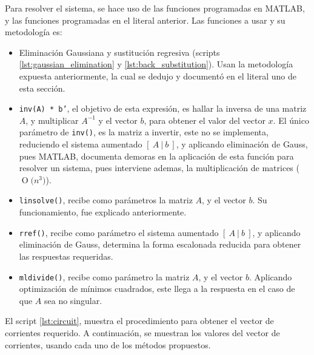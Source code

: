 \documentclass[11pt, spanish]{article}
\newcommand{\BigO}[1]{\ensuremath{\operatorname{O}\bigl(#1\bigr)}}
\begin{document}
\begin{enumerate}
Para resolver el sistema, se hace uso de las funciones programadas en \textsc{MATLAB}, y las funciones programadas en el literal anterior. Las funciones a usar y su metodología es:\\

\begin{itemize}
\item Eliminación Gaussiana y sustitución regresiva (scripts \ref{lst:gaussian_elimination} y \ref{lst:back_substitution}). Usan la metodología expuesta anteriormente, la cual se dedujo y documentó en el literal uno de esta sección. 

\item \texttt{inv(A) * b'}, el objetivo de esta expresión, es hallar la inversa de una matriz $A$, y multiplicar $A^{-1}$ y el vector $b$, para obtener el valor del vector $x$. El único parámetro de \texttt{inv()}, es la matriz a invertir, este no se implementa, reduciendo el sistema aumentado $[\ A\ |\ b\ ]$, y aplicando eliminación de Gauss, pues \textsc{MATLAB}, documenta demoras en la aplicación de esta función para resolver un sistema, pues interviene ademas, la multiplicación de matrices (\BigO{n^3 }).

\item \texttt{linsolve()}, recibe como parámetros la matriz $A$, y el vector $b$. Su funcionamiento, fue explicado anteriormente.

\item \texttt{rref()}, recibe como parámetro el sistema aumentado $[\ A\ |\ b\ ]$, y aplicando eliminación de Gauss, determina la forma escalonada reducida para obtener las respuestas requeridas.

\item \texttt{mldivide()}, recibe como parámetro la matriz $A$, y el vector $b$. Aplicando optimización de mínimos cuadrados, este llega a la respuesta en el caso de que $A$ sea no singular.
\end{itemize}

El script \ref{lst:circuit}, muestra el procedimiento para obtener el vector de corrientes requerido. A continuación, se muestran los valores del vector de corrientes, usando cada uno de los métodos propuestos.


\end{enumerate}
\end{document}
